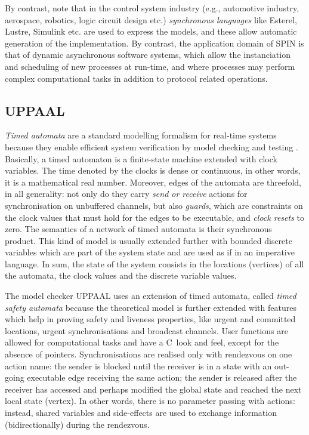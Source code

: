 \documentclass[a4paper,11pt,twoside]{article}
\newcommand\SPIN{\textsf{SPIN}\xspace}
\newcommand\UPPAAL{\textsf{UPPAAL}\xspace}
\newcommand\Clang{\textsf{C}\xspace}
\newcommand\Esterel{\textsf{Esterel}\xspace}
\newcommand\Lustre{\textsf{Lustre}\xspace}
\newcommand\Simulink{\textsf{Simulink}\xspace}
\begin{document}
By contrast, note that in the control system industry (e.g.,
automotive industry, aerospace, robotics, logic circuit design etc.)
\emph{synchronous languages} like \Esterel, \Lustre, \Simulink
etc. are used to express the models, and these allow automatic
generation of the implementation. By contrast, the application domain
of \SPIN is that of dynamic asynchronous software systems, which allow
the instanciation and scheduling of new processes at run\hyp{}time,
and where processes may perform complex computational tasks in
addition to protocol related operations.

\subsection{UPPAAL}

\emph{Timed automata} are a standard modelling formalism for
real\hyp{}time systems because they enable efficient system
verification by model checking and testing
\citep{Bouyer:2003,BengtssonYi:2004}. Basically, a timed automaton is
a finite\hyp{}state machine extended with clock variables. The time
denoted by the clocks is dense or continuous, in other words, it is a
mathematical real number. Moreover, edges of the automata are
threefold, in all generality: not only do they carry \emph{send or
  receive} actions for synchronisation on unbuffered channels, but
also \emph{guards}, which are constraints on the clock values that
must hold for the edges to be executable, and \emph{clock resets} to
zero. The semantics of a network of timed automata is their
synchronous product. This kind of model is usually extended further
with bounded discrete variables which are part of the system state and
are used as if in an imperative language. In sum, the state of the
system consists in the locations (vertices) of all the automata, the
clock values and the discrete variable values.

The model checker \UPPAAL \citep{Amnell:2001,BehrmannDavidLarsen:2004}
uses an extension of timed automata, called \emph{timed safety
  automata} because the theoretical model is further extended with
features which help in proving safety and liveness properties, like
urgent and committed locations, urgent synchronisations and broadcast
channels. User functions are allowed for computational tasks and have
a \Clang~look and feel, except for the absence of
pointers. Synchronisations are realised only with rendezvous on one
action name: the sender is blocked until the receiver is in a state
with an out\hyp{}going executable edge receiving the same action; the
sender is released after the receiver has accessed and perhaps
modified the global state and reached the next local state
(vertex). In other words, there is no parameter passing with actions:
instead, shared variables and side\hyp{}effects are used to exchange
information (bidirectionally) during the rendezvous.
\end{document}
